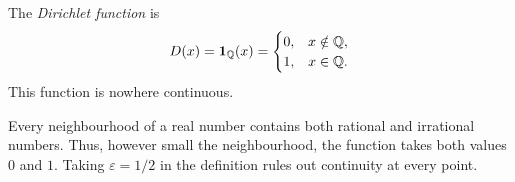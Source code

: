\begin{example}
  \label{thm:analysis-i:dirichlet-function}
  The \emph{Dirichlet function} is
  \[
    D(x)=\mathbf{1}_{\mathbb{Q}}(x)=
    \begin{cases}
      0,&x\notin\mathbb{Q},\\
      1,&x\in\mathbb{Q}.
    \end{cases}
  \]
  This function is nowhere continuous.


  Every neighbourhood of a real number contains both rational and
  irrational numbers. Thus, however small the neighbourhood, the function
  takes both values $0$ and $1$. Taking $\varepsilon=1/2$ in the definition
  rules out continuity at every point.

\end{example}

